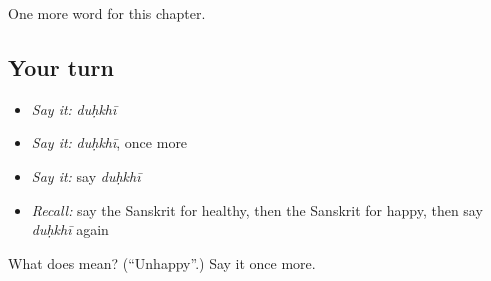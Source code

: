 \begin{grammarlens}[title={What you've built}]
One more word for this chapter.
\end{grammarlens}

\subsection*{Your turn}
\begin{itemize}
\raggedright
  \item \emph{Say it:} \emph{duḥkhī}
  \item \emph{Say it:} \emph{duḥkhī}, once more
  \item \emph{Say it:} say \emph{duḥkhī}
  \item \emph{Recall:} say the Sanskrit for healthy, then the Sanskrit for happy, then say \emph{duḥkhī} again
\end{itemize}

\begin{tcolorbox}[breakable,colback=teal!4,colframe=teal!35!black,title={Before you move on}]
What does  mean? (\textquotedblleft{}Unhappy\textquotedblright{}.) Say it once more.
\end{tcolorbox}
